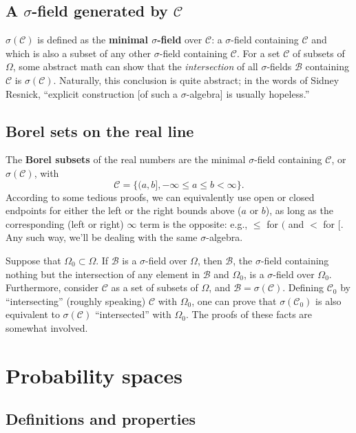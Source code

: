 \documentclass[12pt]{article}
\begin{document}
\subsection{A $\sigma$-field generated by $\mathcal C$}

$\sigma(\mathcal C)$ is defined as the \textbf{minimal $\sigma$-field} over $\mathcal C$: a $\sigma$-field containing $\mathcal C$ and which is also a subset of any other $\sigma$-field containing $\mathcal C$. For a set $\mathcal C$ of subsets of $\Omega$, some abstract math can show that the \emph{intersection} of all $\sigma$-fields $\mathcal B$ containing $\mathcal C$ is $\sigma(\mathcal C)$. Naturally, this conclusion is quite abstract; in the words of Sidney Resnick, ``explicit construction [of such a $\sigma$-algebra] is usually hopeless.''

\subsection{Borel sets on the real line}

The \textbf{Borel subsets} of the real numbers are the minimal $\sigma$-field containing $\mathcal C$, or $\sigma(\mathcal C)$, with
\[ \mathcal C = \{ (a, b], -\infty \leq a \leq b < \infty \}. \]
According to some tedious proofs, we can equivalently use open or closed endpoints for either the left or the right bounds above ($a$ or $b$), as long as the corresponding (left or right) $\infty$ term is the opposite: e.g., $\leq$ for $($ and $<$ for $[$. Any such way, we'll be dealing with the same $\sigma$-algebra.

Suppose that $\Omega_0 \subset \Omega$. If $\mathcal B$ is a $\sigma$-field over $\Omega$, then $\mathcal B$, the $\sigma$-field containing nothing but the intersection of any element in $\mathcal B$ and $\Omega_0$, is a $\sigma$-field over $\Omega_0$. Furthermore, consider $\mathcal C$ as a set of subsets of $\Omega$, and $\mathcal B = \sigma(\mathcal C)$. Defining $\mathcal C_0$ by ``intersecting'' (roughly speaking) $\mathcal C$ with $\Omega_0$, one can prove that $\sigma(\mathcal C_0)$ is also equivalent to $\sigma(\mathcal C)$ ``intersected'' with $\Omega_0$. The proofs of these facts are somewhat involved.

\section{Probability spaces}

\subsection{Definitions and properties}
\end{document}
